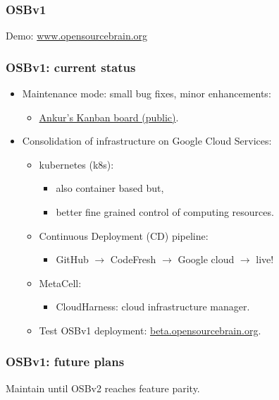 \begin{frame}
  \titlepage{}
\end{frame}
\begin{frame}[c]
  \frametitle{OSBv1}

  Demo: \url{www.opensourcebrain.org}

\end{frame}
\begin{frame}[c]
  \frametitle{OSBv1: current status}
  \begin{itemize}
    \item Maintenance mode: small bug fixes, minor enhancements:
      \begin{itemize}
        \item \href{app.zenhub.com}{Ankur's Kanban board (public)}.
      \end{itemize}
      \pause{}
    \item Consolidation of infrastructure on Google Cloud Services:
      \begin{itemize}
        \item kubernetes (k8s):
          \begin{itemize}
            \item also container based but,
            \item better fine grained control of computing resources.
          \end{itemize}
        \item Continuous Deployment (CD) pipeline:
          \begin{itemize}
            \item GitHub \(\rightarrow{}\) CodeFresh \(\rightarrow{}\) Google cloud \(\rightarrow{}\) live!
          \end{itemize}
          \pause{}
        \item MetaCell:
          \begin{itemize}
            \item CloudHarness: cloud infrastructure manager.
          \end{itemize}
        \item Test OSBv1 deployment: \url{beta.opensourcebrain.org}.
      \end{itemize}
  \end{itemize}
\end{frame}
\begin{frame}[c]
  \frametitle{OSBv1: future plans}
  Maintain until OSBv2 reaches feature parity.
\end{frame}
